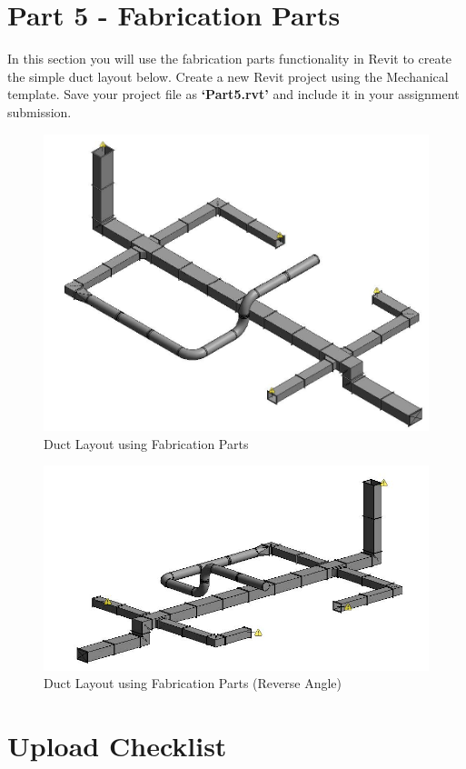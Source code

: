 \newpage

\section*{Part 5 - Fabrication Parts}
In this section you will use the fabrication parts functionality in Revit to create the simple duct layout below. Create a new Revit project using the Mechanical template. Save your project file as \textbf{‘Part5.rvt’} and include it in your assignment submission.

\begin{figure}[h]
	\centering
	\includegraphics[width=0.7\linewidth]{img/FabParts.jpg}
	\caption{Duct Layout using Fabrication Parts}
	\label{fig:FabParts}
\end{figure}


\begin{figure}[h]
	\centering
	\includegraphics[width=0.7\linewidth]{img/FabPartsReverse.jpg}
	\caption{Duct Layout using Fabrication Parts (Reverse Angle)}
	\label{fig:FabPartsReverse}
\end{figure}

\newpage

\section*{Upload Checklist}

